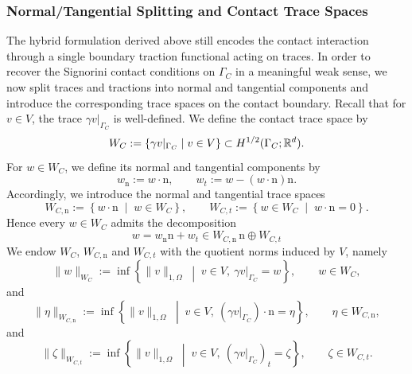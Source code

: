 \subsubsection{Normal/Tangential Splitting and Contact Trace Spaces}
The hybrid formulation derived above still encodes the contact interaction through a single boundary traction functional acting on traces. In order to recover the Signorini contact conditions on $\Gamma_C$ in a meaningful weak sense, we now split traces and tractions into normal and tangential components and introduce the corresponding trace spaces on the contact boundary. Recall that for $v\in V$, the trace $\gamma v|_{\Gamma_C}$ is well-defined. We define the contact trace space by
\begin{equation*}
	W_C := \left\{\gamma v|_{\Gamma_C}\; \middle|\; v\in V\right\}\subset H^{1/2}(\Gamma_C;{\mathbb R}^d).
\end{equation*}
For $w\in W_C$, we define its normal and tangential components by
\begin{equation*}
	w_\mathrm{n} := w\cdot \mathrm n,
	\qquad
	w_t := w - (w\cdot \mathrm n)\mathrm n.
\end{equation*}
Accordingly, we introduce the normal and tangential trace spaces
\begin{equation*}
	W_{C,\mathrm{n}} := \left\{w\cdot \mathrm n\; \middle|\; w\in W_C\right\},
	\qquad
	W_{C,t} := \left\{w\in W_C\; \middle|\; w\cdot \mathrm n = 0\right\}.
\end{equation*}
Hence every $w\in W_C$ admits the decomposition
\begin{equation*}
	w = w_\mathrm{n}\mathrm n + w_t\in W_{C,\mathrm{n}}\,\mathrm{n}\oplus W_{C,t}
\end{equation*}
We endow $W_C$, $W_{C,\mathrm{n}}$ and $W_{C,t}$ with the quotient norms induced by $V$, namely
\begin{equation}\label{eq:norm_WC}
	\|w\|_{W_C}
	:=
	\inf\left\{\|v\|_{1,\Omega}\; \middle|\; v\in V,\ \gamma v|_{\Gamma_C}=w\right\},
	\qquad w\in W_C,
\end{equation}
and
\begin{equation}\label{eq:norm_WCn}
	\|\eta\|_{W_{C,\mathrm{n}}}
	:=
	\inf\left\{\|v\|_{1,\Omega}\; \middle|\; v\in V,\ (\gamma v|_{\Gamma_C})\cdot \mathrm n=\eta\right\},
	\qquad \eta\in W_{C,\mathrm{n}},
\end{equation}
and
\begin{equation}\label{eq:norm_WCt}
	\|\zeta\|_{W_{C,t}}
	:=
	\inf\left\{\|v\|_{1,\Omega}\; \middle|\; v\in V,\ (\gamma v|_{\Gamma_C})_t=\zeta\right\},
	\qquad \zeta\in W_{C,t}.
\end{equation}
